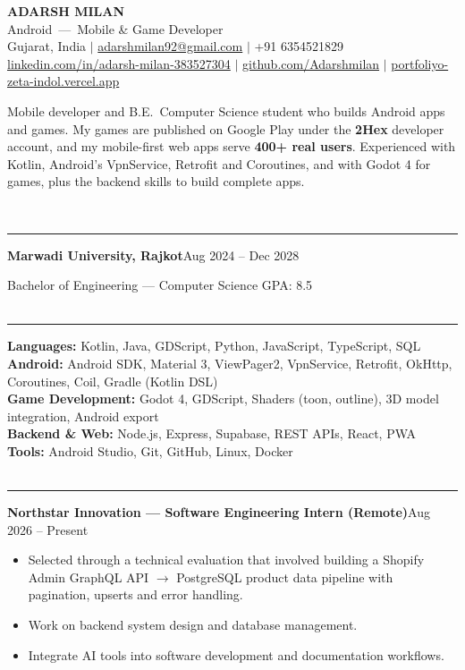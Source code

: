 \documentclass[10pt,a4paper]{article}
\renewcommand{\section}[1]{\vspace{6pt}{\large\bfseries\MakeUppercase{#1}}\\[-7pt]\rule{\textwidth}{0.6pt}\vspace{2pt}}
\newcommand{\entry}[2]{\par\textbf{#1}\hfill #2\par}
\newenvironment{points}{\vspace{-4pt}\begin{itemize}\setlength{\itemsep}{0pt}\setlength{\parskip}{0pt}\setlength{\topsep}{0pt}\setlength{\partopsep}{0pt}\setlength{\leftmargin}{12pt}}{\end{itemize}\vspace{-2pt}}
\newcommand{\sep}{\enspace$|$\enspace}
\begin{document}
\begin{center}
  {\Huge\bfseries ADARSH MILAN}\\[3pt]
  {\large Android \,---\, Mobile \& Game Developer}\\[3pt]
  Gujarat, India \sep
  \href{mailto:adarshmilan92@gmail.com}{adarshmilan92@gmail.com} \sep
  +91 6354521829\\[1pt]
  \href{https://www.linkedin.com/in/adarsh-milan-383527304}{linkedin.com/in/adarsh-milan-383527304} \sep
  \href{https://github.com/Adarshmilan}{github.com/Adarshmilan} \sep
  \href{https://portfoliyo-zeta-indol.vercel.app/}{portfoliyo-zeta-indol.vercel.app}
\end{center}

Mobile developer and B.E.\ Computer Science student who builds Android apps and games. My games are
published on Google Play under the \textbf{2Hex} developer account, and my mobile-first web apps serve \textbf{400+
real users}. Experienced with Kotlin, Android's VpnService, Retrofit and Coroutines, and with Godot 4 for games,
plus the backend skills to build complete apps.

\section{Education}
\entry{Marwadi University, Rajkot}{Aug 2024 -- Dec 2028}
Bachelor of Engineering --- Computer Science \hfill GPA: 8.5\\

\section{Skills}
\textbf{Languages:} Kotlin, Java, GDScript, Python, JavaScript, TypeScript, SQL\\
\textbf{Android:} Android SDK, Material 3, ViewPager2, VpnService, Retrofit, OkHttp, Coroutines, Coil, Gradle (Kotlin DSL)\\
\textbf{Game Development:} Godot 4, GDScript, Shaders (toon, outline), 3D model integration, Android export\\
\textbf{Backend \& Web:} Node.js, Express, Supabase, REST APIs, React, PWA\\
\textbf{Tools:} Android Studio, Git, GitHub, Linux, Docker\\

\section{Experience}
\entry{Northstar Innovation --- Software Engineering Intern (Remote)}{Aug 2026 -- Present}
\begin{points}
  \item Selected through a technical evaluation that involved building a Shopify Admin GraphQL API $\rightarrow$ PostgreSQL product data pipeline with pagination, upserts and error handling.
  \item Work on backend system design and database management.
  \item Integrate AI tools into software development and documentation workflows.
\end{points}
\end{document}
